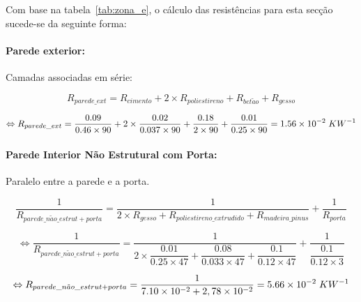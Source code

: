 \documentclass[12pt, a4paper]{article}
\begin{document}
Com base na tabela~\ref*{tab:zona_e}, o cálculo das resistências para esta secção sucede-se da seguinte forma:

\paragraph{Parede exterior:}\label{par:zona_e_ext}Camadas associadas em série:

\begin{equation}
	R_{parede\_ext} = R_{cimento} + 2 \times R_{poliestireno} + R_{bet\tilde{a}o} + R_{gesso}
	\label{eq:zona_e_ext_1}
\end{equation}

\begin{equation}
	\Leftrightarrow R_{parede\_ext} =
	\dfrac{0.09}{0.46 \times 90} +
	2 \times \dfrac{0.02}{0.037 \times 90} +
	\dfrac{0.18}{2 \times 90} +
	\dfrac{0.01}{0.25 \times 90} = 1.56 \times 10^{-2} \hspace{1mm} KW^{-1}
	\label{eq:zona_e_ext_2}
\end{equation}

\paragraph{Parede Interior N\~ao Estrutural com Porta:}\label{par:zona_e_int_n_est}Paralelo entre a parede e a porta.

\begin{equation}
    \dfrac{1}{R_{parede\_n\tilde{a}o\_estrut + porta}} =
			\dfrac{1}{
            2 \times R_{gesso} + R_{poliestireno\_extrudido} + R_{madeira\_pinus}
			}
			+
			\dfrac{1}{
				R_{porta}
			}
    \label{eq:zona_e_int_n_est_1}
\end{equation}

\begin{equation}
    \Leftrightarrow \dfrac{1}{R_{parede\_n\tilde{a}o\_estrut + porta}} =
			\dfrac{1}{
            2 \times \dfrac{0.01}{0.25 \times 47} +
            \dfrac{0.08}{0.033 \times 47} +
            \dfrac{0.1}{0.12 \times 47}
        	}
			+
			\dfrac{1}{
            \dfrac{0.1}{0.12 \times 3}
			}
    \label{eq:zona_e_int_n_est_2}
\end{equation}

\begin{equation}
    \Leftrightarrow R_{parede\_n\tilde{a}o\_estrut + porta} =
	\dfrac{1}{
        7.10 \times 10^{-2} + 2,78 \times 10^{-2}
	}
	= 5.66 \times 10^{-2} \hspace{1mm} KW^{-1}
    \label{eq:zona_e_int_n_est_3}
\end{equation}
\end{document}
